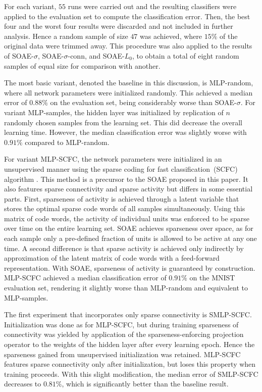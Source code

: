 \documentclass[twoside,11pt]{article}
\newcommand{\0}{\mathcal{O}}
\begin{document}
For each variant, $55$ runs were carried out and the resulting classifiers were applied to the evaluation set to compute the classification error.
Then, the best four and the worst four results were discarded and not included in further analysis.
Hence a random sample of size $47$ was achieved, where $15\%$ of the original data were trimmed away.
This procedure was also applied to the results of SOAE-$\sigma$, SOAE-$\sigma$-conn, and SOAE-$L_0$, to obtain a total of eight random samples of equal size for comparison with another.

The most basic variant, denoted the baseline in this discussion, is MLP-random, where all network parameters were initialized randomly.
This achieved a median error of $0.88\%$ on the evaluation set, being considerably worse than SOAE-$\sigma$.
For variant MLP-samples, the hidden layer was initialized by replication of $n$ randomly chosen samples from the learning set.
This did decrease the overall learning time.
However, the median classification error was slightly worse with $0.91\%$ compared to MLP-random.

For variant MLP-SCFC, the network parameters were initialized in an unsupervised manner using the sparse coding for fast classification~(SCFC) algorithm \citep{Thom2011d}.
This method is a precursor to the SOAE proposed in this paper.
It also features sparse connectivity and sparse activity but differs in some essential parts.
First, sparseness of activity is achieved through a latent variable that stores the optimal sparse code words of all samples simultaneously.
Using this matrix of code words, the activity of individual units was enforced to be sparse over time on the entire learning set.
SOAE achieves sparseness over space, as for each sample only a pre-defined fraction of units is allowed to be active at any one time.
A second difference is that sparse activity is achieved only indirectly by approximation of the latent matrix of code words with a feed-forward representation.
With SOAE, sparseness of activity is guaranteed by construction.
MLP-SCFC achieved a median classification error of $0.91\%$ on the MNIST evaluation set, rendering it slightly worse than MLP-random and equivalent to MLP-samples.

The first experiment that incorporates only sparse connectivity is SMLP-SCFC.
Initialization was done as for MLP-SCFC, but during training sparseness of connectivity was yielded by application of the sparseness-enforcing projection operator to the weights of the hidden layer after every learning epoch.
Hence the sparseness gained from unsupervised initialization was retained.
MLP-SCFC features sparse connectivity only after initialization, but loses this property when training proceeds.
With this slight modification, the median error of SMLP-SCFC decreases to $0.81\%$, which is significantly better than the baseline result.
\end{document}
